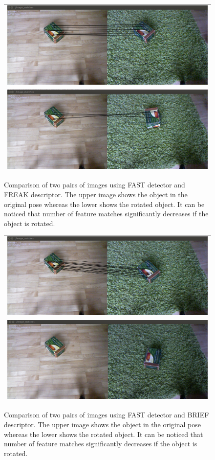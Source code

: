 \begin{figure}
    \begin{tabular}{c}
 

\includegraphics[width=0.7\columnwidth]{figures/freak-no-rotation.png}\\
\includegraphics[width=0.7\columnwidth]{figures/freak-rotation.png}\\
    \end{tabular}


\caption{Comparison of two pairs of images using FAST detector and FREAK descriptor. The upper image shows the object in the original pose whereas the lower shows the rotated object. It can be noticed that number of feature matches significantly decreases if the object is rotated. }
\label{fig:freak-features}
\end{figure}

\begin{figure}
    \begin{tabular}{c}
 

\includegraphics[width=0.7\columnwidth]{figures/brief-no-rotation.png}\\
\includegraphics[width=0.7\columnwidth]{figures/brief-rotation.png}\\
    \end{tabular}


\caption{Comparison of two pairs of images using FAST detector and BRIEF descriptor. The upper image shows the object in the original pose whereas the lower shows the rotated object. It can be noticed that number of feature matches significantly decreases if the object is rotated. }
\label{fig:brief-features}
\end{figure}



